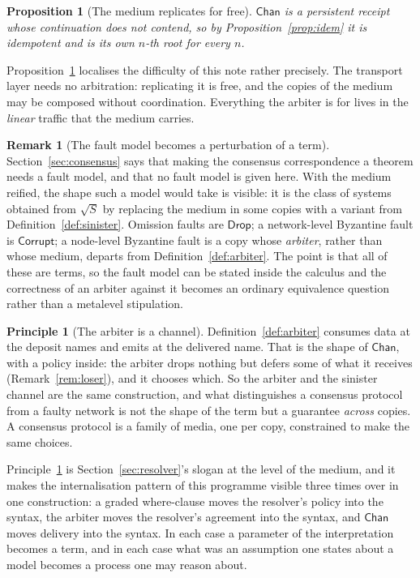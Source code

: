 \documentclass[11pt]{article}
\newtheorem{proposition}[theorem]{Proposition}
\theoremstyle{definition}
\newtheorem{remark}[theorem]{Remark}
\newtheorem{principle}[theorem]{Principle}
\newcommand{\rt}[1]{\sqrt{#1}}
\begin{document}
\begin{proposition}[The medium replicates for free]\label{prop:chanidem}
$\mathsf{Chan}$ is a persistent receipt whose continuation does not contend, so by Proposition~\ref{prop:idem} it is idempotent and is its own $n$-th root for every $n$.
\end{proposition}

Proposition~\ref{prop:chanidem} localises the difficulty of this note rather precisely. The transport layer needs no arbitration: replicating it is free, and the copies of the medium may be composed without coordination. Everything the arbiter is for lives in the \emph{linear} traffic that the medium carries.

\begin{remark}[The fault model becomes a perturbation of a term]\label{rem:faultmodel}
Section~\ref{sec:consensus} says that making the consensus correspondence a theorem needs a fault model, and that no fault model is given here. With the medium reified, the shape such a model would take is visible: it is the class of systems obtained from $\rt{S}$ by replacing the medium in some copies with a variant from Definition~\ref{def:sinister}. Omission faults are $\mathsf{Drop}$; a network-level Byzantine fault is $\mathsf{Corrupt}$; a node-level Byzantine fault is a copy whose \emph{arbiter}, rather than whose medium, departs from Definition~\ref{def:arbiter}. The point is that all of these are terms, so the fault model can be stated inside the calculus and the correctness of an arbiter against it becomes an ordinary equivalence question rather than a metalevel stipulation.
\end{remark}

\begin{principle}[The arbiter is a channel]\label{prin:arbchan}
Definition~\ref{def:arbiter} consumes data at the deposit names and emits at the delivered name. That is the shape of $\mathsf{Chan}$, with a policy inside: the arbiter drops nothing but defers some of what it receives (Remark~\ref{rem:loser}), and it chooses which. So the arbiter and the sinister channel are the same construction, and what distinguishes a consensus protocol from a faulty network is not the shape of the term but a guarantee \emph{across} copies. A consensus protocol is a family of media, one per copy, constrained to make the same choices.
\end{principle}

Principle~\ref{prin:arbchan} is Section~\ref{sec:resolver}'s slogan at the level of the medium, and it makes the internalisation pattern of this programme visible three times over in one construction: a graded where-clause moves the resolver's policy into the syntax, the arbiter moves the resolver's agreement into the syntax, and $\mathsf{Chan}$ moves delivery into the syntax. In each case a parameter of the interpretation becomes a term, and in each case what was an assumption one states about a model becomes a process one may reason about.
\end{document}
